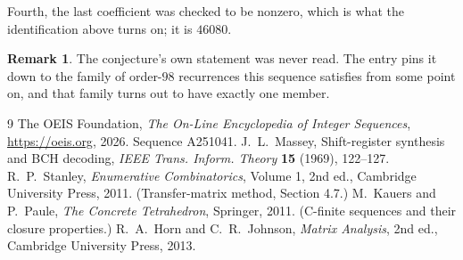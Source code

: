 \documentclass[11pt,a4paper]{article}
\theoremstyle{plain}
\theoremstyle{definition}
\newtheorem{remark}[theorem]{Remark}
\begin{document}
Fourth, the last coefficient was checked to be nonzero, which is what the identification above
turns on; it is $46080$.

\begin{remark}
The conjecture's own statement was never read. The entry pins it down to the family of
order-$98$ recurrences this sequence satisfies from some point on, and that family turns
out to have exactly one member.
\end{remark}

\begin{thebibliography}{9}
 The OEIS Foundation, \emph{The On-Line Encyclopedia of Integer
Sequences}, \url{https://oeis.org}, 2026. Sequence A251041.
 J.~L.~Massey, Shift-register synthesis and BCH decoding, \emph{IEEE
Trans. Inform. Theory} \textbf{15} (1969), 122--127.
 R.~P.~Stanley, \emph{Enumerative Combinatorics}, Volume 1, 2nd ed.,
Cambridge University Press, 2011. (Transfer-matrix method, Section 4.7.)
 M.~Kauers and P.~Paule, \emph{The Concrete Tetrahedron}, Springer, 2011.
(C-finite sequences and their closure properties.)
 R.~A.~Horn and C.~R.~Johnson, \emph{Matrix Analysis}, 2nd ed., Cambridge
University Press, 2013.
\end{thebibliography}
\end{document}
